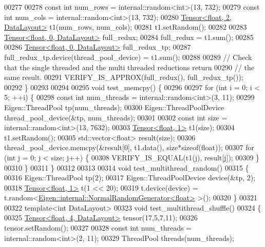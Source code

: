 \begin{DoxyCode}
00277 
00278   \textcolor{keyword}{const} \textcolor{keywordtype}{int} num\_rows = internal::random<int>(13, 732);
00279   \textcolor{keyword}{const} \textcolor{keywordtype}{int} num\_cols = internal::random<int>(13, 732);
00280   \hyperlink{class_eigen_1_1_tensor}{Tensor<float, 2, DataLayout>} t1(num\_rows, num\_cols);
00281   t1.setRandom();
00282 
00283   \hyperlink{class_eigen_1_1_tensor}{Tensor<float, 0, DataLayout>} full\_redux;
00284   full\_redux = t1.sum();
00285 
00286   \hyperlink{class_eigen_1_1_tensor}{Tensor<float, 0, DataLayout>} full\_redux\_tp;
00287   full\_redux\_tp.device(thread\_pool\_device) = t1.sum();
00288 
00289   \textcolor{comment}{// Check that the single threaded and the multi threaded reductions return}
00290   \textcolor{comment}{// the same result.}
00291   VERIFY\_IS\_APPROX(full\_redux(), full\_redux\_tp());
00292 \}
00293 
00294 
00295 \textcolor{keywordtype}{void} test\_memcpy() \{
00296 
00297   \textcolor{keywordflow}{for} (\textcolor{keywordtype}{int} i = 0; i < 5; ++i) \{
00298     \textcolor{keyword}{const} \textcolor{keywordtype}{int} num\_threads = internal::random<int>(3, 11);
00299     Eigen::ThreadPool tp(num\_threads);
00300     Eigen::ThreadPoolDevice thread\_pool\_device(&tp, num\_threads);
00301 
00302     \textcolor{keyword}{const} \textcolor{keywordtype}{int} size = internal::random<int>(13, 7632);
00303     \hyperlink{class_eigen_1_1_tensor}{Tensor<float, 1>} t1(size);
00304     t1.setRandom();
00305     std::vector<float> result(size);
00306     thread\_pool\_device.memcpy(&result[0], t1.data(), size*\textcolor{keyword}{sizeof}(float));
00307     \textcolor{keywordflow}{for} (\textcolor{keywordtype}{int} j = 0; j < size; j++) \{
00308       VERIFY\_IS\_EQUAL(t1(j), result[j]);
00309     \}
00310   \}
00311 \}
00312 
00313 
00314 \textcolor{keywordtype}{void} test\_multithread\_random()
00315 \{
00316   Eigen::ThreadPool tp(2);
00317   Eigen::ThreadPoolDevice device(&tp, 2);
00318   \hyperlink{class_eigen_1_1_tensor}{Tensor<float, 1>} t(1 << 20);
00319   t.device(device) = t.random<\hyperlink{class_eigen_1_1internal_1_1_normal_random_generator}{Eigen::internal::NormalRandomGenerator<float>}
      >();
00320 \}
00321 
00322 \textcolor{keyword}{template}<\textcolor{keywordtype}{int} DataLayout>
00323 \textcolor{keywordtype}{void} test\_multithread\_shuffle()
00324 \{
00325   \hyperlink{class_eigen_1_1_tensor}{Tensor<float, 4, DataLayout>} tensor(17,5,7,11);
00326   tensor.setRandom();
00327 
00328   \textcolor{keyword}{const} \textcolor{keywordtype}{int} num\_threads = internal::random<int>(2, 11);
00329   ThreadPool threads(num\_threads);

\end{DoxyCode}
